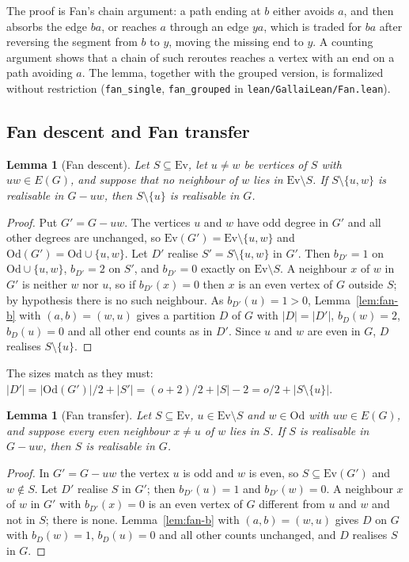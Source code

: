 \documentclass[11pt]{amsart}
\newtheorem{lemma}[theorem]{Lemma}
\theoremstyle{definition}
\newcommand{\Ev}{\mathrm{Ev}}
\newcommand{\Od}{\mathrm{Od}}
\begin{document}
The proof is Fan's chain argument: a path ending at $b$ either avoids $a$, and then absorbs the edge
$ba$, or reaches $a$ through an edge $ya$, which is traded for $ba$ after reversing the segment
from $b$ to $y$, moving the missing end to $y$. A counting argument shows that a chain of such
reroutes reaches a vertex with an end on a path avoiding $a$. The lemma, together with the grouped
version, is formalized without restriction (\texttt{fan\_single}, \texttt{fan\_grouped} in
\texttt{lean/GallaiLean/Fan.lean}).

\subsection{Fan descent and Fan transfer}

\begin{lemma}[Fan descent]\label{lem:fandescent}
Let $S\subseteq\Ev$, let $u\ne w$ be vertices of $S$ with $uw\in E(G)$, and suppose that no
neighbour of $w$ lies in $\Ev\setminus S$. If $S\setminus\{u,w\}$ is realisable in $G-uw$, then
$S\setminus\{u\}$ is realisable in $G$.
\end{lemma}

\begin{proof}
Put $G'=G-uw$. The vertices $u$ and $w$ have odd degree in $G'$ and all other degrees are unchanged,
so $\Ev(G')=\Ev\setminus\{u,w\}$ and $\Od(G')=\Od\cup\{u,w\}$. Let $D'$ realise
$S'=S\setminus\{u,w\}$ in $G'$. Then $b_{D'}=1$ on $\Od\cup\{u,w\}$, $b_{D'}=2$ on $S'$, and
$b_{D'}=0$ exactly on $\Ev\setminus S$. A neighbour $x$ of $w$ in $G'$ is neither $w$ nor $u$, so if
$b_{D'}(x)=0$ then $x$ is an even vertex of $G$ outside $S$; by hypothesis there is no such
neighbour. As $b_{D'}(u)=1>0$, Lemma~\ref{lem:fan-b} with $(a,b)=(w,u)$ gives a partition $D$ of $G$
with $|D|=|D'|$, $b_D(w)=2$, $b_D(u)=0$ and all other end counts as in $D'$. Since $u$ and $w$ are
even in $G$, $D$ realises $S\setminus\{u\}$.
\end{proof}

The sizes match as they must: $|D'|=|\Od(G')|/2+|S'|=(o+2)/2+|S|-2=o/2+|S\setminus\{u\}|$.

\begin{lemma}[Fan transfer]\label{lem:fantransfer}
Let $S\subseteq\Ev$, $u\in\Ev\setminus S$ and $w\in\Od$ with $uw\in E(G)$, and suppose every even
neighbour $x\ne u$ of $w$ lies in $S$. If $S$ is realisable in $G-uw$, then $S$ is realisable in
$G$.
\end{lemma}

\begin{proof}
In $G'=G-uw$ the vertex $u$ is odd and $w$ is even, so $S\subseteq\Ev(G')$ and $w\notin S$. Let $D'$
realise $S$ in $G'$; then $b_{D'}(u)=1$ and $b_{D'}(w)=0$. A neighbour $x$ of $w$ in $G'$ with
$b_{D'}(x)=0$ is an even vertex of $G$ different from $u$ and $w$ and not in $S$; there is none.
Lemma~\ref{lem:fan-b} with $(a,b)=(w,u)$ gives $D$ on $G$ with $b_D(w)=1$, $b_D(u)=0$ and all other
counts unchanged, and $D$ realises $S$ in $G$.
\end{proof}
\end{document}
